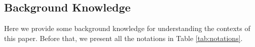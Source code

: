 \documentclass{article}
\newtheorem{fact}{Fact}[section]
\newtheorem{definition}{Definition}[section]
\begin{document}
\subsection{Background Knowledge}
Here we provide some background knowledge for understanding the contexts of this paper. Before that, we present all the notations in Table \ref{tab:notations}.

\end{document}
